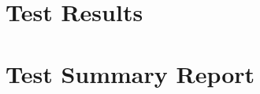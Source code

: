 \documentclass{article}
\begin{document}

\section{Test Results}%


\section{Test Summary Report}%


\newpage
\raggedright
{}

\end{document}
